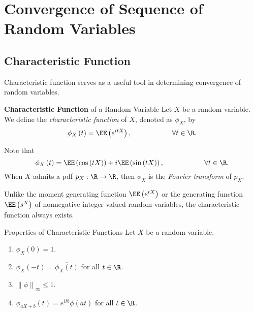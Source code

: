 \documentclass[stat901]{subfiles}
\begin{document}
    \section{Convergence of Sequence of Random Variables}
    
    \subsection{Characteristic Function}
    
    Characteristic function serves as a useful tool in determining convergence of random variables.

    \begin{definition}{\textbf{Characteristic Function} of a Random Variable}
        Let $X$ be a random variable. We define the \emph{characteristic function} of $X$, denoted as $\phi_X$, by
        \begin{equation*}
            \phi_X\left( t \right) = \EE\left( e^{itX} \right), \hspace{2cm}\forall t\in\R.
        \end{equation*}
    \end{definition}

    \np Note that
    \begin{equation*}
        \phi_X\left( t \right) = \EE\left( \cos\left( tX \right) \right) + i\EE\left( \sin\left( tX \right) \right), \hspace{2cm}\forall t\in\R.
    \end{equation*}
    When $X$ admits a pdf $p_X:\R\to\R$, then $\phi_X$ is the \textit{Fourier transform} of $p_X$.

    \np Unlike the moment generating function $\EE\left( e^{tX} \right)$ or the generating function $\EE\left( s^X \right)$ of nonnegative integer valued random variables, the characteristic function always exists.

    \begin{prop}{Properties of Characteristic Functions}
        Let $X$ be a random variable.
        \begin{enumerate}
            \item $\phi_X\left( 0 \right) = 1$.
            \item $\phi_X\left( -t \right) = \overline{\phi_X\left( t \right)}$ for all $t\in\R$.
            \item $\left\lVert \phi \right\rVert_{\infty} \leq 1$.
            \item $\phi_{aX+b}\left( t \right) = e^{itb}\phi\left( at \right)$ for all $t\in\R$.
        \end{enumerate}
    \end{prop}
\end{document}
